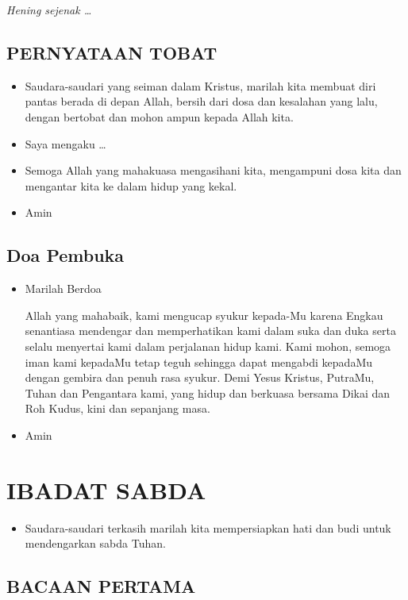 \documentclass[a5paper,headsepline,titlepage,11pt,nnormalheadings]{scrbook}
\newcommand{\BU}[1]{\begin{itemize} \item[U:] #1 \end{itemize}}
\newcommand{\BI}[1]{\begin{itemize} \item[I:] #1 \end{itemize}}
\begin{document}
\emph{Hening sejenak \dots}
  
\subsection*{PERNYATAAN TOBAT}
\BI{Saudara-saudari yang seiman dalam Kristus, marilah kita membuat diri pantas berada di depan Allah, bersih dari dosa dan kesalahan yang lalu, dengan bertobat dan mohon ampun kepada Allah kita.}

\BI{Saya mengaku \dots}

\BI{Semoga Allah yang mahakuasa mengasihani kita, 
mengampuni dosa kita dan mengantar kita ke dalam hidup 
yang kekal.}

\BU{Amin}

\subsection*{Doa Pembuka} 
\BI{Marilah Berdoa 

Allah yang mahabaik, kami mengucap syukur kepada-Mu karena Engkau senantiasa mendengar dan memperhatikan kami dalam suka dan duka serta selalu menyertai kami dalam perjalanan hidup kami. Kami mohon, semoga iman kami kepadaMu tetap teguh sehingga dapat mengabdi kepadaMu dengan gembira dan penuh rasa syukur. Demi Yesus Kristus, PutraMu, Tuhan dan Pengantara kami, yang hidup dan berkuasa bersama Dikai dan Roh Kudus, kini dan sepanjang masa.
 }

\BU{Amin} 
 
\section*{IBADAT SABDA}
\BI{Saudara-saudari terkasih marilah kita mempersiapkan hati 
dan budi untuk mendengarkan sabda Tuhan.} 

\subsection*{BACAAN PERTAMA}
\end{document}
